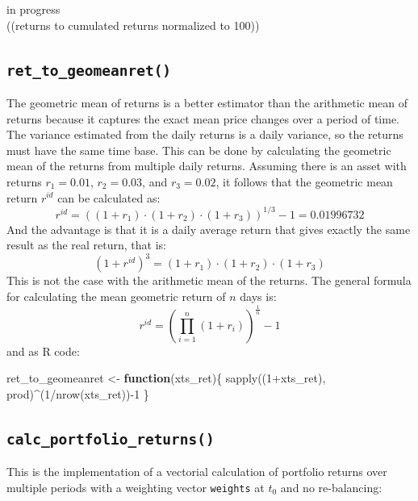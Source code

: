 \documentclass[
  oneside]{book}
\newenvironment{Shaded}{\begin{snugshade}}{\end{snugshade}}
\newcommand{\ControlFlowTok}[1]{\textcolor[rgb]{0.13,0.29,0.53}{\textbf{#1}}}
\newcommand{\DecValTok}[1]{\textcolor[rgb]{0.00,0.00,0.81}{#1}}
\newcommand{\FunctionTok}[1]{\textcolor[rgb]{0.00,0.00,0.00}{#1}}
\newcommand{\NormalTok}[1]{#1}
\newcommand{\OtherTok}[1]{\textcolor[rgb]{0.56,0.35,0.01}{#1}}
\newcommand{\SpecialCharTok}[1]{\textcolor[rgb]{0.00,0.00,0.00}{#1}}
\begin{document}
\textbar\textbar\textbar in progress\textbar\textbar\textbar{}\\
((returns to cumulated returns normalized to 100))

\hypertarget{geomeanret}{%
\subsection{\texorpdfstring{\texttt{ret\_to\_geomeanret()}}{ret\_to\_geomeanret()}}\label{geomeanret}}

The geometric mean of returns is a better estimator than the arithmetic mean of returns because it captures the exact mean price changes over a period of time. The variance estimated from the daily returns is a daily variance, so the returns must have the same time base. This can be done by calculating the geometric mean of the returns from multiple daily returns. Assuming there is an asset with returns \(r_1 = 0.01\), \(r_2=0.03\), and \(r_3=0.02\), it follows that the geometric mean return \(r^{id}\) can be calculated as:
\[
  r^{id} = ((1+r_1) \cdot (1+r_2) \cdot (1+r_3))^{1/3}-1 = 0.01996732
\]
And the advantage is that it is a daily average return that gives exactly the same result as the real return, that is:
\[
  (1+r^{id})^3 = (1+r_1) \cdot (1+r_2) \cdot (1+r_3)
\]
This is not the case with the arithmetic mean of the returns. The general formula for calculating the mean geometric return of \(n\) days is:
\[
  r^{id} = (\prod_{i=1}^n (1+r_i))^{\frac{1}{n}}-1
\]
and as R code:

\begin{Shaded}
\begin{Highlighting}[]
\NormalTok{ret\_to\_geomeanret }\OtherTok{\textless{}{-}} \ControlFlowTok{function}\NormalTok{(xts\_ret)\{}
  \FunctionTok{sapply}\NormalTok{((}\DecValTok{1}\SpecialCharTok{+}\NormalTok{xts\_ret), prod)}\SpecialCharTok{\^{}}\NormalTok{(}\DecValTok{1}\SpecialCharTok{/}\FunctionTok{nrow}\NormalTok{(xts\_ret))}\SpecialCharTok{{-}}\DecValTok{1}
\NormalTok{\}}
\end{Highlighting}
\end{Shaded}

\hypertarget{calc_portfolio_returns}{%
\subsection{\texorpdfstring{\texttt{calc\_portfolio\_returns()}}{calc\_portfolio\_returns()}}\label{calc_portfolio_returns}}

This is the implementation of a vectorial calculation of portfolio returns over multiple periods with a weighting vector \texttt{weights} at \(t_0\) and no re-balancing:
\end{document}
